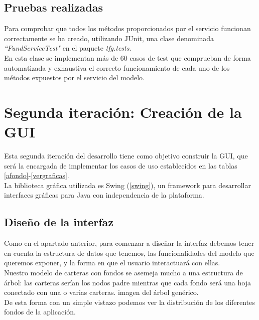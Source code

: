 \documentclass[12pt, a4paper]{book}
\begin{document}
\newpage

\subsection{Pruebas realizadas}

Para comprobar que todos los métodos proporcionados por el servicio funcionan correctamente se ha creado, utilizando JUnit, una clase denominada \textit{``FundServiceTest"} en el paquete \textit{tfg.tests}.\\

En esta clase se implementan más de 60 casos de test que comprueban de forma automatizada y exhaustiva el correcto funcionamiento de cada uno de los métodos expuestos por el servicio del modelo.



\newpage

\newpage
\section{Segunda iteración: Creación de la GUI}

Esta segunda iteración del desarrollo tiene como objetivo construir la \gls{GUI}, que será la encargada de implementar los casos de uso establecidos en las tablas \ref{afondo}-\ref{vergraficas}.
\\

La biblioteca gráfica utilizada es Swing (\ref{swing}), un framework para desarrollar interfaces gráficas para Java con independencia de la plataforma.

\subsection{Diseño de la interfaz}

Como en el apartado anterior, para comenzar a diseñar la interfaz debemos tener en cuenta la estructura de datos que tenemos, las funcionalidades del modelo que queremos exponer, y la forma en que el usuario interactuará con ellas.
\\

Nuestro modelo de carteras con fondos se asemeja mucho a una estructura de árbol: las carteras serían los nodos padre mientras que cada fondo será una hoja conectado con una o varias carteras. imagen del árbol genérico.
\\

De esta forma con un simple vistazo podemos ver la distribución de los diferentes fondos de la aplicación.
\\
\end{document}
